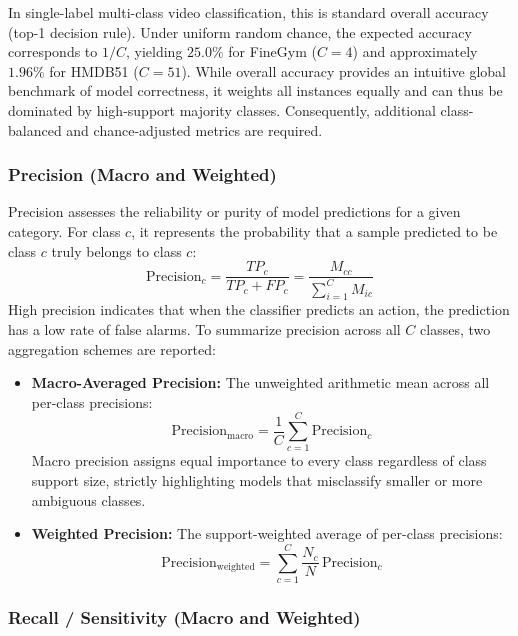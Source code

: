 In single-label multi-class video classification, this is standard overall accuracy (top-1 decision rule). Under uniform random chance, the expected accuracy corresponds to $1/C$, yielding $25.0\%$ for FineGym ($C = 4$) and approximately $1.96\%$ for HMDB51 ($C = 51$). While overall accuracy provides an intuitive global benchmark of model correctness, it weights all instances equally and can thus be dominated by high-support majority classes. Consequently, additional class-balanced and chance-adjusted metrics are required.

\subsubsection{Precision (Macro and Weighted)}

Precision assesses the reliability or purity of model predictions for a given category. For class $c$, it represents the probability that a sample predicted to be class $c$ truly belongs to class $c$:
\begin{equation}
\text{Precision}_c = \frac{TP_c}{TP_c + FP_c} = \frac{M_{cc}}{\sum_{i=1}^{C} M_{ic}}
\end{equation}
High precision indicates that when the classifier predicts an action, the prediction has a low rate of false alarms. To summarize precision across all $C$ classes, two aggregation schemes are reported:
\begin{itemize}[leftmargin=*]
    \item \textbf{Macro-Averaged Precision:} The unweighted arithmetic mean across all per-class precisions:
    \begin{equation}
    \text{Precision}_{\text{macro}} = \frac{1}{C}\sum_{c=1}^{C} \text{Precision}_c
    \end{equation}
    Macro precision assigns equal importance to every class regardless of class support size, strictly highlighting models that misclassify smaller or more ambiguous classes.
    \item \textbf{Weighted Precision:} The support-weighted average of per-class precisions:
    \begin{equation}
    \text{Precision}_{\text{weighted}} = \sum_{c=1}^{C} \frac{N_c}{N} \, \text{Precision}_c
    \end{equation}
\end{itemize}

\subsubsection{Recall / Sensitivity (Macro and Weighted)}

